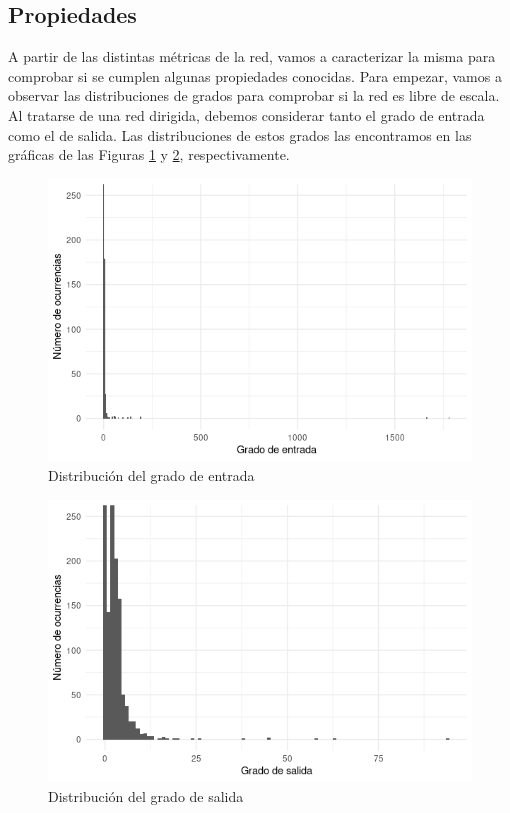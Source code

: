 \subsection{Propiedades}

A partir de las distintas métricas de la red, vamos a caracterizar la misma para
comprobar si se cumplen algunas propiedades conocidas. Para empezar, vamos a
observar las distribuciones de grados para comprobar si la red es libre de
escala. Al tratarse de una red dirigida, debemos considerar tanto el grado de
entrada como el de salida. Las distribuciones de estos grados las encontramos en
las gráficas de las Figuras \ref{fig:indegree-distribution-plot} y
\ref{fig:outdegree-distribution-plot}, respectivamente.

\begin{figure}
    \centering
    \includegraphics[width=\textwidth]{images/plots/indegree.png}
    \caption{Distribución del grado de entrada}
    \label{fig:indegree-distribution-plot}
\end{figure}

\begin{figure}
    \centering
    \includegraphics[width=\textwidth]{images/plots/outdegree.png}
    \caption{Distribución del grado de salida}
    \label{fig:outdegree-distribution-plot}
\end{figure}

